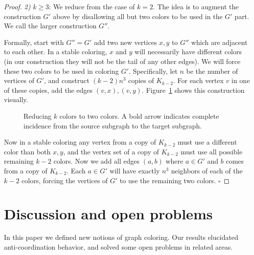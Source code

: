 \documentclass{llncs}
\begin{document}
\begin{proof}
\noindent \emph{2)} $k\ge3$:
We reduce from the case of $k=2$. The idea is to augment the
construction $G'$ above by disallowing all but two colors to be used in the
$G'$ part. We call the larger construction $G''$. 

Formally, start with $G'' = G'$ add two new vertices $x,y$ to $G''$ which are
adjacent to each other. In a stable coloring, $x$ and $y$ will necessarily have
different colors (in our construction they will not be the tail of any other
edges). We will force these two colors to be used in coloring $G'$.
Specifically, let $n$ be the number of vertices of $G'$, and construct
$(k-2)n^3$ copies of $K_{k-2}$. For each vertex $v$ in one of these copies, add
the edges $(v,x), (v,y)$. Figure~\ref{weakkcolornphard} shows this construction
visually. 

\begin{figure}[htb]
\centering
{}
\caption{Reducing $k$ colors to two colors. A bold arrow indicates complete
incidence from the source subgraph to the target subgraph.}
\label{weakkcolornphard}
\end{figure}

Now in a stable coloring any vertex from a copy of $K_{k-2}$ must use a
different color than both $x,y$, and the vertex set of a copy of $K_{k-2}$ must
use all possible remaining $k-2$ colors. Now we add all edges $(a,b)$ where $a
\in G'$ and $b$ comes from a copy of $K_{k-2}$. Each $a \in G'$ will have
exactly $n^3$ neighbors of each of the $k-2$ colors, forcing the vertices
of $G'$ to use the remaining two colors.
\hfill $\square$
\end{proof}

\section{Discussion and open problems}

In this paper we defined new notions of graph coloring.
Our results elucidated anti-coordination behavior, and
solved some open problems in related areas.
\end{document}
